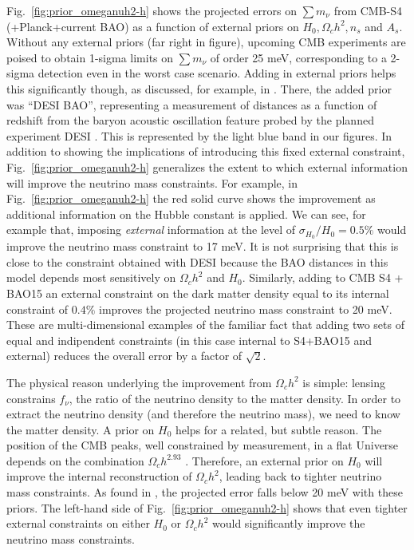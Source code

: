 \documentclass[aps,prd,reprint,superscriptaddress,nofootinbib,floatfix]{revtex4-1}
\newcommand{\reffig}[1]{Fig.~\ref{fig:#1}}
\begin{document}
\reffig{prior_omeganuh2-h} shows the projected errors on $\sum m_\nu$ from CMB-S4 (+Planck+current BAO) as a function of external priors on $H_{0}, \Omega_{c}h^{2}, n_s$ and $A_s$. 
Without any external priors (far right in figure), upcoming CMB experiments are poised to obtain 1-sigma limits on $\sum m_\nu$ of order 25 meV, corresponding to a 2-sigma detection even in the worst case scenario. Adding in external priors helps this significantly though, as discussed, for example, in \cite{di-valentino:2015,2013arXiv1309.5383A,pan:2015a,allison:2015}. 
There, the added prior was ``DESI BAO'', representing a measurement of distances as a function of redshift from the baryon acoustic oscillation feature probed by the planned experiment DESI \cite{levi:2013}. This is represented by the light blue band in our figures. In addition to showing the implications of introducing this fixed external constraint, \reffig{prior_omeganuh2-h} generalizes the extent to which external information will improve the neutrino mass constraints. For example, in \reffig{prior_omeganuh2-h} the red solid curve shows the improvement as additional information on the Hubble constant is applied. We can see, for example that, imposing {\it external} information at the level of $\sigma_{H_0}/H_0=0.5\%$ would improve the neutrino mass constraint to 17 meV. It is not surprising that this is close to the constraint obtained with DESI because the BAO distances in this model depends most sensitively on $\Omega_ch^2$ and $H_{0}$.
Similarly, adding to CMB S4 + BAO15 an external constraint on the dark matter density equal to its internal constraint of $0.4\%$ improves the projected neutrino mass constraint to 20 meV. These are multi-dimensional examples of the familiar fact that adding two sets of equal and indipendent constraints (in this case internal to S4+BAO15 and external) reduces the overall error by a factor of $\sqrt{2}$. 

The physical reason underlying the improvement from $\Omega_ch^2$ is simple: lensing constrains $f_\nu$, the ratio of the neutrino density to the matter density. In order to extract the neutrino density (and therefore the neutrino mass), we need to know the matter density. A prior on $H_{0}$ helps for a related, but subtle reason. 
The position of the CMB peaks, well constrained by measurement, in a flat Universe depends on the combination $\Omega_ch^{2.93}$ \cite{planck-collaboration:2014}.
Therefore, an external prior on $H_{0}$ will improve the internal reconstruction of $\Omega_ch^2$, leading back to tighter neutrino mass constraints.
As found in \cite{2013arXiv1309.5383A,pan:2015a,allison:2015}, the projected error falls below 20 meV with these priors. 
The left-hand side of \reffig{prior_omeganuh2-h} shows that even tighter external constraints on either $H_0$ or $\Omega_ch^2$ would significantly improve the neutrino mass constraints.
\end{document}
